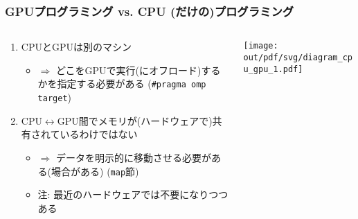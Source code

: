 \documentclass[10pt,dvipdfmx]{beamer}
\newcommand{\ao}[1]{{\color{blue}#1}}
\begin{document}
\begin{frame}
  \frametitle{GPUプログラミング vs. CPU (だけの)プログラミング}
  \begin{columns}
    \begin{column}{0.55\textwidth}
      \begin{enumerate}
      \item CPUとGPUは別のマシン
        \begin{itemize}
        \item $\Rightarrow$ どこをGPUで実行(にオフロード)するかを指定する必要がある
          (\ao{\tt \#pragma omp target})
        \end{itemize}
      \item CPU$\leftrightarrow$GPU間でメモリが(ハードウェアで)共有されているわけではない
        \begin{itemize}
        \item $\Rightarrow$ データを明示的に移動させる必要がある(場合がある)
          (\ao{\tt map}節)
        \item 注: 最近のハードウェアでは不要になりつつある
        \end{itemize}
      \end{enumerate}
    \end{column}
    \begin{column}{0.5\textwidth}
      \texttt{[image: out/pdf/svg/diagram\_cpu\_gpu\_1.pdf]}
    \end{column}
  \end{columns}
\end{frame}
\end{document}
